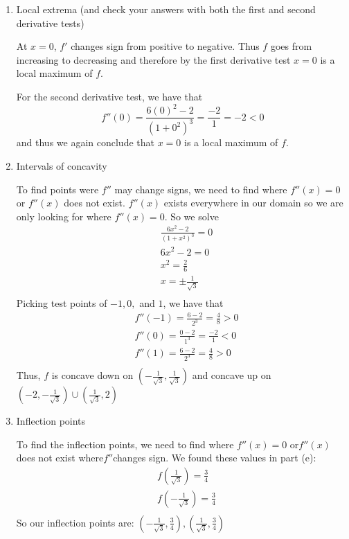 \documentclass[nooutcomes]{ximera}
\begin{document}
\begin{problem}
\begin{enumerate}
	\item  Local extrema (and check your answers with both the first and second derivative tests)
	
		\begin{freeResponse}
		At $x=0$, $f'$ changes sign from positive to negative.  Thus $f$ goes from increasing to decreasing and therefore by the first derivative test $x=0$ is a local maximum of $f$.  
		
		For the second derivative test, we have that
		$$ f''(0) = \frac{6(0)^2 - 2}{(1+0^2)^3} = \frac{-2}{1} = -2 < 0 $$
		and thus we again conclude that $x=0$ is a local maximum of $f$.
		\end{freeResponse}
		
	\item  Intervals of concavity
	
		\begin{freeResponse}
		To find points were $f''$ may change signs, we need to find where $f''(x)=0$ or $f''(x)$ does not exist.  $f''(x)$ exists everywhere in our domain so we are only looking for where $f''(x)=0$.  So we solve
		\begin{align*}
  		& \frac{6{{x}^{2}}-2}{{{(1+{{x}^{2}})}^{3}}}=0 \\ 
 		& 6{{x}^{2}}-2=0 \\ 
 		& {{x}^{2}}=\frac{2}{6} \\ 
 		& x=\pm \frac{1}{\sqrt{3}} \\ 
		\end{align*}
		Picking test points of $-1, 0, $ and $1$, we have that
		\begin{align*}
		& f''(-1) = \frac{6-2}{2^3} = \frac{4}{8} > 0 \\
		& f''(0) = \frac{0-2}{1^3} = \frac{-2}{1} < 0 \\
		& f''(1) = \frac{6-2}{2^3} = \frac{4}{8} > 0 \\
		\end{align*}
		Thus, $f$ is concave down on $\left( - \frac{1}{\sqrt{3}}, \frac{1}{\sqrt{3}} \right)$ and concave up on \\ 
		$\left( -2, - \frac{1}{\sqrt{3}} \right) \cup \left( \frac{1}{\sqrt{3}}, 2 \right)$
		\end{freeResponse}
		
	\item  Inflection points
	
		\begin{freeResponse}
		To find the inflection points, we need to find where $f''(x)=0$ or$f''(x)$ does not exist  where$f''$changes sign.  We 			found these values in part (e):
		\begin{align*}
 		 & f\left( \frac{1}{\sqrt{3}} \right)=\frac{3}{4} \\ 
 		& f\left( -\frac{1}{\sqrt{3}} \right)=\frac{3}{4} \\ 
		\end{align*}  
		So our inflection points are: $\left( -\frac{1}{\sqrt{3}},\frac{3}{4} \right),\left( \frac{1}{\sqrt{3}},\frac{3}{4} \right)$
		\end{freeResponse}
		

\end{enumerate}
\end{problem}
\end{document}
